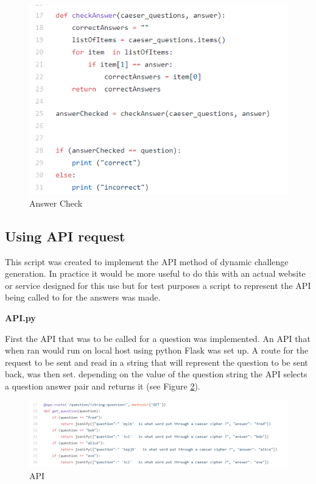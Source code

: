 \documentclass[12pt,a4paper]{article}
\begin{document}
\begin{figure}[!ht]
    \centering
    \includegraphics[width=1.0\textwidth]{Figs/random2.PNG} 
    \caption{Answer Check} 
    \label{Random2}
\end{figure} 


\subsection{Using API request}   

This script was created to implement the API method of dynamic challenge generation. In practice it would be more useful to do this with an actual website or service designed for this use but for test purposes a script to represent the API being called to for the answers was made.  

\textbf{API.py}    

First the API that was to be called for a question was implemented. An API that when ran would run on local host using python Flask was set up. A route for the request to be sent and read in a string that will represent the question to be sent back, was then set. depending on the value of the question string the API selects a question answer pair and returns it (see Figure \ref{API}).


\begin{figure}[!ht]
    \centering
    \includegraphics[width=1.0\textwidth]{Figs/API.PNG} 
    \caption{API} 
    \label{API}
\end{figure}
\end{document}
